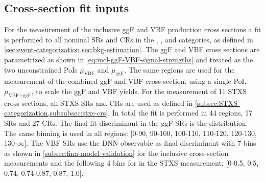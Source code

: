 \subsection{Cross-section fit inputs}
For the measurement of the inclusive ggF and VBF production cross sections a fit is performed to all nominal SRs and CRs in the \ZeroJet, \OneJet, and \TwoJet categories, as defined in \cref{sec:event-categorization,sec:bkg-estimation}. 
The ggF and VBF cross sections are parametrized as shown in \cref{eq:incl-ggF-VBF-signal-strengths} and treated as the two unconstrained PoIs $\mu_{\text{VBF}}$ and $\mu_{\text{ggF}}$. 
The same regions are used for the measurement of the combined ggF and VBF cross section, using a single PoI, $\mu_{\text{VBF+ggF}}$, to scale the ggF and VBF yields. 
For the measurement of 11 STXS cross sections, all STXS SRs and CRs are used as defined in \cref{subsec:STXS-categorization,subsubsec:stxs-crs}. In total the fit is performed in 44 regions, 17 SRs and 27 CRs. 
The final fit discriminant in the ggF SRs is the \mT distribution. The same binning is used in all regions: [0-90, 90-100, 100-110, 110-120, 120-130, 130-$\infty$]. 
The VBF SRs use the DNN observable as final discriminant with 7 bins as shown in \cref{subsec:fina-model-validation} for the inclusive cross-section measurements and the following 4 bins for in the STXS measurement: [0-0.5, 0.5, 0.74, 0.74-0.87, 0.87, 1.0]. 

